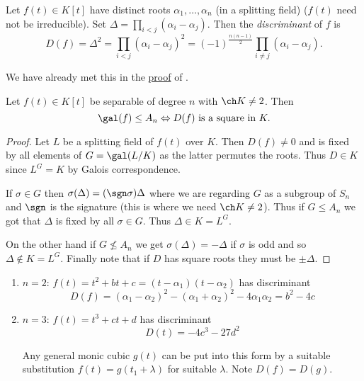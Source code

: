 \documentclass[a4paper]{article}
\begin{document}
\begin{definition}[Discriminant]
  Let \(f(t) \in K[t]\) have distinct roots \(\alpha_1, \dots, \alpha_n\) (in a splitting field) (\(f(t)\) need not be irreducible). Set \(\Delta = \prod_{i < j}(\alpha_i - \alpha_j)\). Then the \emph{discriminant} of \(f\) is
  \[
    D(f) = \Delta^2 = \prod_{i < j}(\alpha_i - \alpha_j)^2 = (-1)^{\frac{n(n-1)}{2}} \prod_{i \neq j}(\alpha_i - \alpha_j).
  \]
\end{definition}

\begin{remark}
  We have already met this in the \hyperref[proof:vandermonde]{proof} of .
\end{remark}

\begin{lemma}
  Let \(f(t) \in K[t]\) be separable of degree \(n\) with \(\ch K \neq 2\). Then
  \[
    \gal(f) \leq A_n \Leftrightarrow D(f) \text{ is a square in } K.
  \]
\end{lemma}

\begin{proof}
  Let \(L\) be a splitting field of \(f(t)\) over \(K\). Then \(D(f) \neq 0\) and is fixed by all elements of \(G = \gal(L/K)\) as the latter permutes the roots. Thus \(D \in K\) since \(L^G = K\) by Galois correspondence.

  If \(\sigma \in G\) then \(\sigma(\Delta) = (\sgn \sigma) \Delta\) where we are regarding \(G\) as a subgroup of \(S_n\) and \(\sgn\) is the signature (this is where we need \(\ch K \neq 2\)). Thus if \(G \leq A_n\) we got that \(\Delta\) is fixed by all \(\sigma \in G\). Thus \(\Delta \in K = L^G\).

  On the other hand if \(G \nleq A_n\) we get \(\sigma(\Delta) = -\Delta\) if \(\sigma\) is odd and so \(\Delta \notin K = L^G\). Finally note that if \(D\) has square roots they must be \(\pm \Delta\).
\end{proof}

\begin{eg}\leavevmode
  \begin{enumerate}
  \item \(n = 2\): \(f(t) =t^2 + bt + c = (t - \alpha_1)(t - \alpha_2)\) has discriminant
    \[
      D(f) = (\alpha_1 - \alpha_2)^2 - (\alpha_1 + \alpha_2)^2 - 4\alpha_1\alpha_2 = b^2 - 4c
    \]
  \item \(n = 3\): \(f(t) = t^3 + ct + d\) has discriminant
    \[
      D(t) = -4c^3 - 27d^2
   \]
   \begin{remark}
     Any general monic cubic \(g(t)\) can be put into this form by a suitable substitution \(f(t) = g(t_1 + \lambda)\) for suitable \(\lambda\). Note \(D(f) = D(g)\).
   \end{remark}
 \end{enumerate}
\end{eg}
\end{document}
